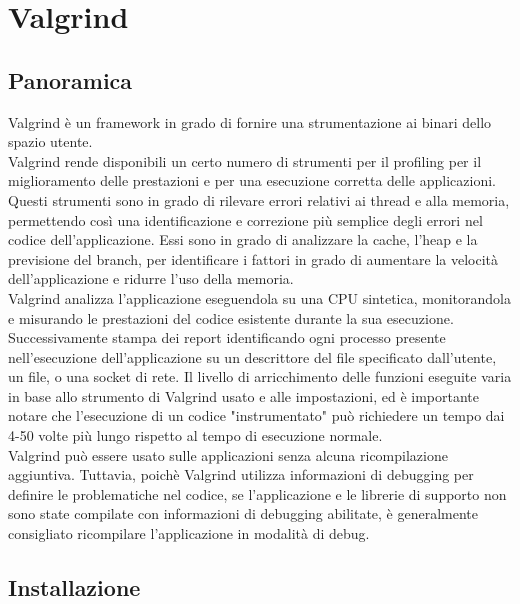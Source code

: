 \documentclass{article}
\begin{document}
\section{Valgrind}

\subsection{Panoramica}
\label{sec:valgrind:panoramica}

Valgrind è un framework in grado di fornire una strumentazione ai binari dello spazio utente. \\

Valgrind rende disponibili un certo numero di strumenti per il profiling per il
miglioramento delle prestazioni e per una esecuzione corretta
delle applicazioni. Questi strumenti sono in grado di rilevare errori relativi
ai thread e alla memoria, permettendo
così una identificazione e correzione più semplice degli errori nel codice
dell'applicazione. Essi sono in grado di analizzare la cache, l'heap e la
previsione del branch, per identificare i fattori in grado di aumentare la
velocità dell'applicazione e ridurre l'uso della memoria. \\

Valgrind analizza l'applicazione eseguendola su una CPU sintetica, monitorandola
e misurando le prestazioni del codice esistente durante la sua esecuzione.
Successivamente stampa dei report identificando ogni processo presente
nell'esecuzione dell'applicazione su un descrittore del file specificato
dall'utente, un file, o una socket di rete. Il livello di arricchimento delle
funzioni eseguite varia in base
allo strumento di Valgrind usato e alle impostazioni, ed è importante notare
che l'esecuzione di un codice "instrumentato" può richiedere un tempo dai 4-50
volte più lungo rispetto al tempo di esecuzione normale. \\

Valgrind può essere usato sulle applicazioni senza alcuna ricompilazione
aggiuntiva. Tuttavia, poichè Valgrind utilizza informazioni di debugging per
definire le problematiche nel codice, se l'applicazione e le librerie di
supporto non sono state compilate con informazioni di debugging abilitate, è
generalmente consigliato ricompilare l'applicazione in modalità di debug.

\subsection{Installazione}
\label{sec:valgrind:installazione}
\end{document}
